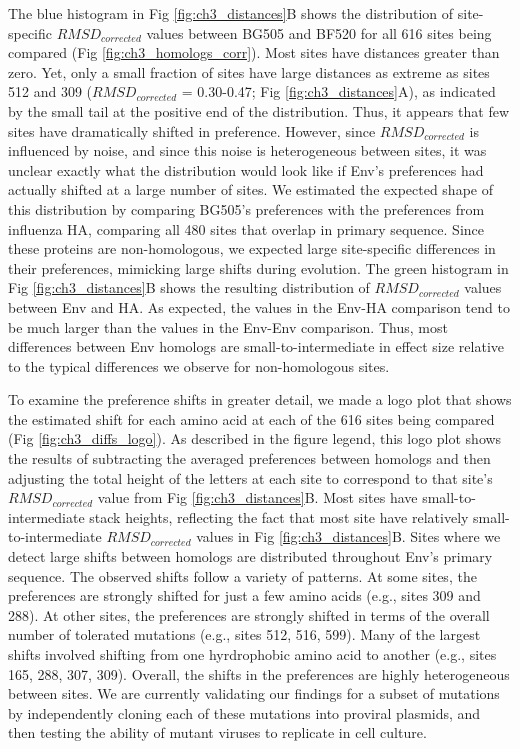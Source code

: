 \documentclass[9pt,lineno]{elife}
\begin{document}
The blue histogram in Fig \ref{fig:ch3_distances}B shows the distribution of site-specific $RMSD_{corrected}$ values between BG505 and BF520 for all 616 sites being compared (Fig \ref{fig:ch3_homologs_corr}).
Most sites have distances greater than zero.
Yet, only a small fraction of sites have large distances as extreme as sites 512 and 309 ($RMSD_{corrected}$ = 0.30-0.47; Fig \ref{fig:ch3_distances}A), as indicated by the small tail at the positive end of the distribution.
Thus, it appears that few sites have dramatically shifted in preference.
However, since $RMSD_{corrected}$ is influenced by noise, and since this noise is heterogeneous between sites, it was unclear exactly what the distribution would look like if Env's preferences had actually shifted at a large number of sites.
We estimated the expected shape of this distribution by comparing BG505's preferences with the preferences from influenza HA, comparing all 480 sites that overlap in primary sequence.
Since these proteins are non-homologous, we expected large site-specific differences in their preferences, mimicking large shifts during evolution.
The green histogram in Fig \ref{fig:ch3_distances}B shows the resulting distribution of $RMSD_{corrected}$ values between Env and HA.
As expected, the values in the Env-HA comparison tend to be much larger than the values in the Env-Env comparison.
Thus, most differences between Env homologs are small-to-intermediate in effect size relative to the typical differences we observe for non-homologous sites.

To examine the preference shifts in greater detail, we made a logo plot that shows the estimated shift for each amino acid at each of the 616 sites being compared (Fig \ref{fig:ch3_diffs_logo}).
As described in the figure legend, this logo plot shows the results of subtracting the averaged preferences between homologs and then adjusting the total height of the letters at each site to correspond to that site's $RMSD_{corrected}$ value from Fig \ref{fig:ch3_distances}B.
Most sites have small-to-intermediate stack heights, reflecting the fact that most site have relatively small-to-intermediate $RMSD_{corrected}$ values in Fig \ref{fig:ch3_distances}B.
Sites where we detect large shifts between homologs are distributed throughout Env's primary sequence.
The observed shifts follow a variety of patterns.
At some sites, the preferences are strongly shifted for just a few amino acids (e.g., sites 309 and 288).
At other sites, the preferences are strongly shifted in terms of the overall number of tolerated mutations (e.g., sites 512, 516, 599).
Many of the largest shifts involved shifting from one hyrdrophobic amino acid to another (e.g., sites 165, 288, 307, 309).
Overall, the shifts in the preferences are highly heterogeneous between sites.
We are currently validating our findings for a subset of mutations by independently cloning each of these mutations into proviral plasmids, and then testing the ability of mutant viruses to replicate in cell culture.
\end{document}
